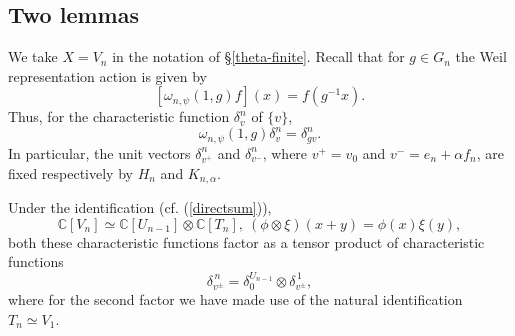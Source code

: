 \documentclass[12pt]{amsart}
\theoremstyle{definition}
\theoremstyle{remark}
\begin{document}
\subsection{Two lemmas}\label{two lemmas}
 
We take $X = V_n$ in the notation of \S \ref{theta-finite}. Recall that for $g\in G_n$ the Weil representation action is given by
\[
[\omega_{n,\psi}(1,g)f](x)=f(g^{-1}x).
\]
Thus, for the characteristic function $\delta_v^n$ of $\{v\}$,
\[
\omega_{n,\psi}(1,g)\delta_v^n = \delta_{gv}^n.
\]
In particular, the unit vectors $\delta_{v^+}^n$ and $\delta_{v^-}^n$, where $v^+=v_0$ and $v^- = e_n+\alpha f_n$, are fixed respectively by $H_n$ and $K_{n,\alpha}$.

Under the identification (cf. (\ref{directsum})),
\begin{equation}\label{eq-pure-tensor}
\mathbb C[V_n]
\simeq
\mathbb C[U_{n-1}]\otimes\mathbb C[T_n],~
(\phi\otimes \xi)(x+y)=\phi(x)\xi(y),
\end{equation}
both these characteristic functions factor as a tensor product of characteristic functions
\[
\delta_{v^\pm}^{\,n}
=
\delta_0^{U_{n-1}}\otimes\delta_{v^\pm}^{\,1},
\]
where for the second factor we have made use of the natural identification $T_n\simeq V_1$.
\end{document}
